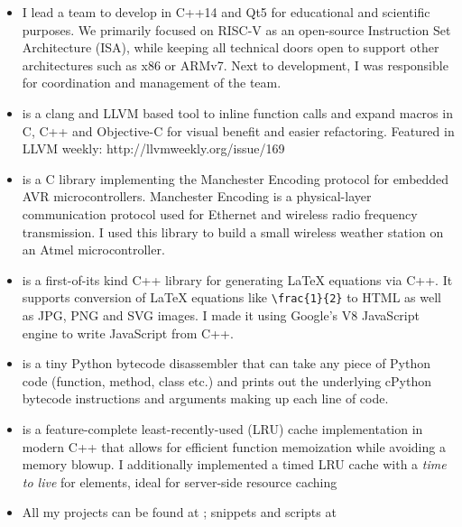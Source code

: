 \begin{itemize}
  \item I lead a team to develop  in C++14 and Qt5 for educational and scientific purposes. We primarily focused on RISC-V as an open-source Instruction Set Architecture (ISA), while keeping all technical doors open to support other architectures such as x86 or ARMv7. Next to development, I was responsible for coordination and management of the team.
  \item {} is a clang and LLVM based tool to inline function calls and expand macros in C, C++ and Objective-C for visual benefit and easier refactoring. Featured in LLVM weekly: http://llvmweekly.org/issue/169
  \item {} is a C library implementing the Manchester Encoding protocol for embedded AVR microcontrollers. Manchester Encoding is a physical-layer communication protocol used for Ethernet and wireless radio frequency transmission. I used this library to build a small wireless weather station on an Atmel microcontroller.
  \item {} is a first-of-its kind C++ library for generating LaTeX equations via C++. It supports conversion of LaTeX equations like \texttt{\textbackslash frac\{1\}\{2\}} to HTML as well as JPG, PNG and SVG images. I made it using Google's V8 JavaScript engine to write JavaScript from C++.
  \item {} is a tiny Python bytecode disassembler that can take any piece of Python code (function, method, class etc.) and prints out the underlying cPython bytecode instructions and arguments making up each line of code.
  \item {} is a feature-complete least-recently-used (LRU) cache implementation in modern C++ that allows for efficient function memoization while avoiding a memory blowup. I additionally implemented a timed LRU cache with a \emph{time to live} for elements, ideal for server-side resource caching
  \item All my projects can be found at
	; snippets and scripts at 
\end{itemize}

